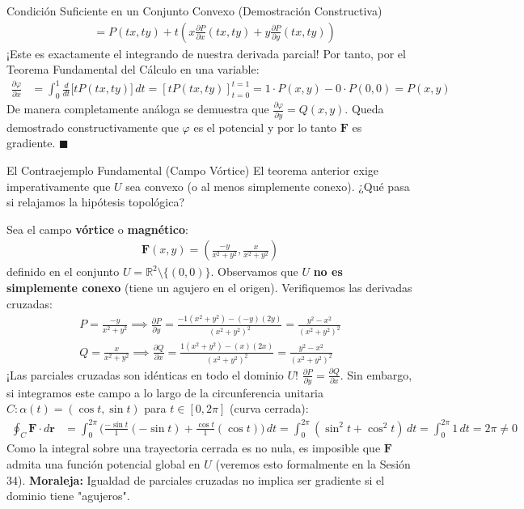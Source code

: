 \documentclass[11pt,a4paper]{article}
\begin{document}
\begin{teoremabox}{Condición Suficiente en un Conjunto Convexo (Demostración Constructiva)}
\begin{align*}
&= P(tx, ty) + t \left( x \frac{\partial P}{\partial x}(tx, ty) + y \frac{\partial P}{\partial y}(tx, ty) \right)
\end{align*}
¡Este es exactamente el integrando de nuestra derivada parcial! Por tanto, por el Teorema Fundamental del Cálculo en una variable:
\begin{align*}
\frac{\partial \varphi}{\partial x} &= \int_0^1 \frac{d}{dt} \big[ t P(tx, ty) \big] \, dt = \left[ t P(tx, ty) \right]_{t=0}^{t=1} = 1 \cdot P(x, y) - 0 \cdot P(0,0) = P(x,y)
\end{align*}
De manera completamente análoga se demuestra que $\frac{\partial \varphi}{\partial y} = Q(x,y)$.
Queda demostrado constructivamente que $\varphi$ es el potencial y por lo tanto $\mathbf{F}$ es gradiente. $\blacksquare$
\end{teoremabox}

\begin{errorbox}{El Contraejemplo Fundamental (Campo Vórtice)}
El teorema anterior exige imperativamente que $U$ sea convexo (o al menos simplemente conexo). ¿Qué pasa si relajamos la hipótesis topológica?

Sea el campo \textbf{vórtice} o \textbf{magnético}:
\begin{align*}
\mathbf{F}(x,y) = \left( \frac{-y}{x^2+y^2}, \frac{x}{x^2+y^2} \right)
\end{align*}
definido en el conjunto $U = \mathbb{R}^2 \setminus \{(0,0)\}$. Observamos que $U$ \textbf{no es simplemente conexo} (tiene un agujero en el origen).
Verifiquemos las derivadas cruzadas:
\begin{align*}
P = \frac{-y}{x^2+y^2} \implies \frac{\partial P}{\partial y} = \frac{-1(x^2+y^2) - (-y)(2y)}{(x^2+y^2)^2} = \frac{y^2-x^2}{(x^2+y^2)^2} \\
Q = \frac{x}{x^2+y^2} \implies \frac{\partial Q}{\partial x} = \frac{1(x^2+y^2) - (x)(2x)}{(x^2+y^2)^2} = \frac{y^2-x^2}{(x^2+y^2)^2}
\end{align*}
¡Las parciales cruzadas son idénticas en todo el dominio $U$! $\frac{\partial P}{\partial y} = \frac{\partial Q}{\partial x}$.
Sin embargo, si integramos este campo a lo largo de la circunferencia unitaria $C: \alpha(t) = (\cos t, \sin t)$ para $t \in [0, 2\pi]$ (curva cerrada):
\begin{align*}
\oint_C \mathbf{F} \cdot d\mathbf{r} &= \int_0^{2\pi} \Big( \frac{-\sin t}{1}(-\sin t) + \frac{\cos t}{1}(\cos t) \Big) \, dt = \int_0^{2\pi} (\sin^2 t + \cos^2 t) \, dt = \int_0^{2\pi} 1 \, dt = 2\pi \neq 0
\end{align*}
Como la integral sobre una trayectoria cerrada es no nula, es imposible que $\mathbf{F}$ admita una función potencial global en $U$ (veremos esto formalmente en la Sesión 34). \textbf{Moraleja:} Igualdad de parciales cruzadas no implica ser gradiente si el dominio tiene "agujeros".
\end{errorbox}
\end{document}
